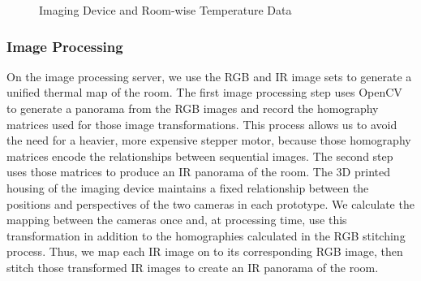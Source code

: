 \documentclass{sig-alternate}
\begin{document}

	
\begin{figure}[h]
 \centering
       \centering
    \caption{Imaging Device and Room-wise Temperature Data}
\end{figure}

\subsubsection{\textbf{Image Processing}}
 \indent On the image processing server, we use the RGB and IR image sets to generate a unified thermal map of the room. The first image processing step uses OpenCV to generate a panorama from the RGB images and record the homography matrices used for those image transformations. This process allows us to avoid the need for a heavier, more expensive stepper motor, because those homography matrices encode the relationships between sequential images. The second step uses those  matrices to produce an IR panorama of the room. The 3D printed housing of the imaging device maintains a fixed relationship between the positions and perspectives of the two cameras in each prototype. We calculate the mapping between the cameras once and, at processing time, use this transformation in addition to the homographies calculated in the RGB stitching process. Thus, we map each IR image on to its corresponding RGB image, then stitch those transformed IR images to create an IR panorama of the room.
\end{document}
